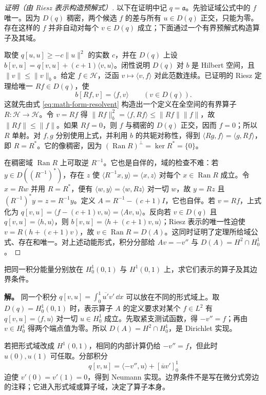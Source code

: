 \begin{proof}[证明（由 Riesz 表示构造预解式）]
以下在证明中记 $q=\mathfrak a$。先验证域公式中的 \(f\) 唯一。因为 \(D(q)\) 稠密，两个候选 \(f\) 的差与所有 \(u\in D(q)\) 正交，只能为零。
存在这样的 \(f\) 并非自动对每个 \(v\in D(q)\) 成立；下面通过一个有界预解式构造算子及其域。

取使 \(q[u,u]\ge-c\|u\|^2\) 的实数 \(c\)，并在 \(D(q)\) 上设 \(b[v,u]=q[v,u]+(c+1)\langle v,u\rangle\)。闭性说明 \(D(q)\) 对 \(b\) 是 Hilbert 空间，且 \(\|v\|\le\|v\|_b\)。给定 \(f\in\mathcal H\)，泛函 \(v\mapsto\langle v,f\rangle\) 对此范数连续。已证明的 Riesz 定理给唯一 \(Rf\in D(q)\)，使
\begin{equation}
 b[Rf,v]=\langle f,v\rangle\qquad(v\in D(q)).
 \label{eq:math-form-resolvent}
\end{equation}
这就先由式 \cref{eq:math-form-resolvent} 构造出一个定义在全空间的有界算子 \(R:\mathcal H\to\mathcal H\)。令 \(v=Rf\) 得 \(\|Rf\|_b^2=\langle f,Rf\rangle\le\|Rf\|\|f\|\)，故 \(\|Rf\|\le\|f\|\)。如果 \(Rf=0\)，则 \(f\) 与稠密的 \(D(q)\) 正交，因而 \(f=0\)；所以 \(R\) 单射。对 \(f,g\) 分别使用上式，并利用 \(b\) 的共轭对称性，得到 \(\langle Rg,f\rangle=\langle g,Rf\rangle\)，即 \(R=R^*\)。它的像稠密，因为 \((\operatorname{Ran}R)^\perp=\ker R^*=\{0\}\)。

在稠密域 \(\operatorname{Ran}R\) 上可取逆 \(R^{-1}\)。它也是自伴的，域的检查不难：若 \(y\in D((R^{-1})^*)\)，存在 \(z\) 使 \(\langle R^{-1}x,y\rangle=\langle x,z\rangle\) 对每个 \(x\in\operatorname{Ran}R\) 成立。令 \(x=Rw\) 并用 \(R=R^*\)，便有 \(\langle w,y\rangle=\langle w,Rz\rangle\) 对一切 \(w\)，故 \(y=Rz\) 且 \((R^{-1})^*y=z=R^{-1}y\)。定义 \(A=R^{-1}-(c+1)I\)，它也自伴。若 \(v=Rf\)，上式化为 \(q[v,u]=\langle f-(c+1)v,u\rangle=\langle Av,u\rangle\)。反向若 \(v\in D(q)\) 且 \(q[v,u]=\langle h,u\rangle\)，则 \(b[v,u]=\langle h+(c+1)v,u\rangle\)；Riesz 表示的唯一性迫使 \(v=R(h+(c+1)v)\)，故 \(v\in\operatorname{Ran}R=D(A)\)。这同时证明了定理所给域公式、存在和唯一。对上述动能形式，积分分部给 \(Av=-v''\) 与 \(D(A)=H^2\cap H_0^1\)。

\end{proof}


\begin{example}[同一能量密度与不同边界实现]
把同一积分能量分别放在 $H_0^1(0,1)$ 与 $H^1(0,1)$ 上，求它们表示的算子及其边界条件。

\textbf{解。} 同一个积分 \(q[v,u]=\int_0^1\overline{u'}v'\,\dd x\) 可以放在不同的形式域上。取 \(D(q)=H_0^1(0,1)\) 时，表示算子 \(A\) 的定义要求对某个 \(f\in L^2\) 有 \(q[v,u]=\langle f,u\rangle\) 对一切 \(u\in H_0^1\) 成立。先取紧支测试函数，得 \(-v''=f\)；再由 \(v\in H_0^1\) 得两个端点值为零。所以 \(D(A)=H^2\cap H_0^1\)，是 Dirichlet 实现。

若把形式域改成 \(H^1(0,1)\)，相同的内部计算仍给 \(-v''=f\)，但此时 \(u(0),u(1)\) 可任取。分部积分
\[
q[v,u]=\langle -v'',u\rangle+[\overline u v']_0^1
\]
迫使 \(v'(0)=v'(1)=0\)，得到 Neumann 实现。边界条件不是写在微分式旁边的注释；它进入形式域或算子域，决定了算子本身。
\end{example}

